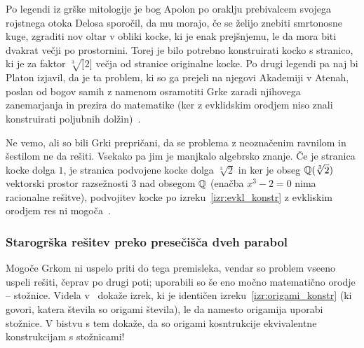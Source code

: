 Po legendi iz grške mitologije je bog Apolon po oraklju prebivalcem svojega rojstnega otoka Delosa sporočil, da mu morajo, če se želijo znebiti smrtonosne kuge, zgraditi nov oltar v obliki kocke, ki je enak prejšnjemu, le da mora biti dvakrat večji po prostornini. Torej je bilo potrebno konstruirati kocko s stranico, ki je za faktor $\sqrt[3][2]$ večja od stranice originalne kocke. Po drugi legendi pa naj bi Platon izjavil, da je ta problem, ki so ga prejeli na njegovi Akademiji v Atenah, poslan od bogov samih z namenom osramotiti Grke zaradi njihovega zanemarjanja in prezira do matematike (ker z evklidskim orodjem niso znali konstruirati poljubnih dolžin)~\cite[str.\ 29]{geometricconstructions}.

Ne vemo, ali so bili Grki prepričani, da se problema z neoznačenim ravnilom in šestilom ne da rešiti. Vsekako pa jim je manjkalo algebrsko znanje. Če je stranica kocke dolga $1$, je stranica podvojene kocke dolga $\sqrt[3]{2}$ in ker je obseg $\mathbb Q(\sqrt[3]{2})$ vektorski prostor razsežnosti $3$ nad obsegom $\mathbb Q$ (enačba $ x^3 - 2 = 0 $ nima racionalne rešitve), podvojitev kocke po izreku~\ref{izr:evkl_konstr} z evkliskim orodjem res ni mogoča~\cite[str. 78]{jerman1998}.

\subsubsection*{Starogrška rešitev preko presečišča dveh parabol}

Mogoče Grkom ni uspelo priti do tega premisleka, vendar so problem vseeno uspeli rešiti, čeprav po drugi poti; uporabili so še eno močno matematično orodje -- stožnice. Videla v~\cite{videla1997} dokaže izrek, ki je identičen izreku~\ref{izr:origami_konstr} (ki govori, katera števila so origami števila), le da namesto origamija uporabi stožnice. V bistvu s tem dokaže, da so origami kosntrukcije ekvivalentne konstrukcijam s stožnicami!

